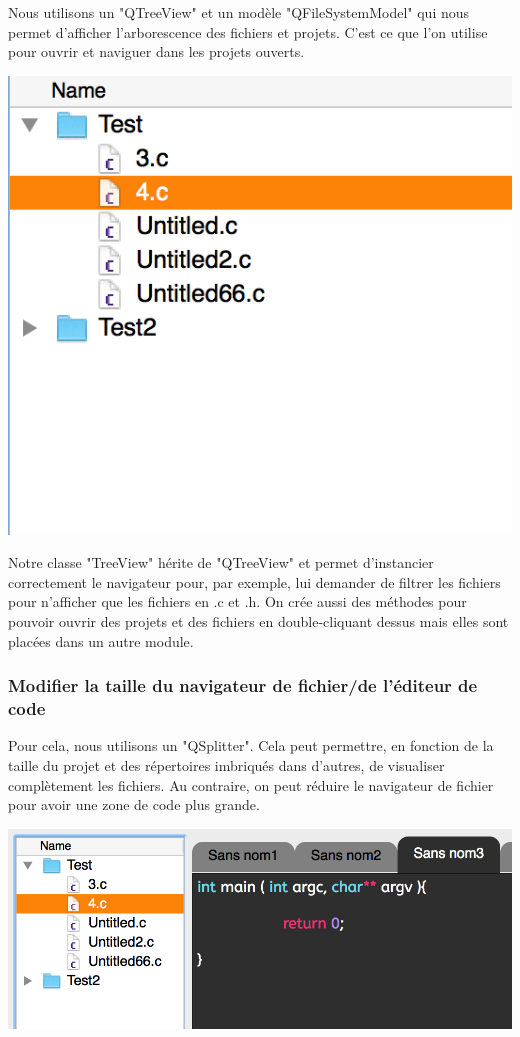 \documentclass[a4paper,12pt]{article}
\begin{document}
				Nous utilisons un "QTreeView" et un modèle "QFileSystemModel" qui nous permet d'afficher l'arborescence des fichiers et projets. C'est ce que l'on utilise pour ouvrir et naviguer dans les projets ouverts.\\
			\begin{center}
				\includegraphics[scale=0.6]{images/QTreeView}
				\vspace{0.6cm}
			\end{center}
			Notre classe "TreeView" hérite de "QTreeView" et permet d'instancier correctement le navigateur pour, par exemple, lui demander de filtrer les fichiers pour n'afficher que les fichiers en .c et .h. On crée aussi des méthodes pour pouvoir ouvrir des projets et des fichiers en double-cliquant dessus mais elles sont placées dans un autre module.\\
			
			\subsubsection*{Modifier la taille du navigateur de fichier/de l'éditeur de code}
				Pour cela, nous utilisons un "QSplitter". Cela peut permettre, en fonction de la taille du projet et des répertoires imbriqués dans d'autres, de visualiser complètement les fichiers. Au contraire, on peut réduire le navigateur de fichier pour avoir une zone de code plus grande.\\
			\begin{center}
				\includegraphics[scale=0.6]{images/QSplitter_1}
				\vspace{0.6cm}
			\end{center}
\end{document}
